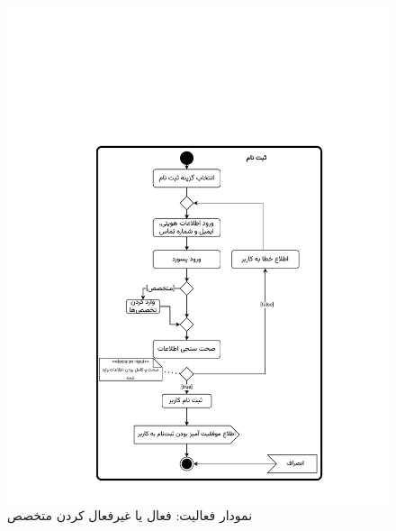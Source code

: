\begin{figure}[ht!]
	\centering
	\includegraphics[scale=0.8, page=8]{figs/OOD-activity1-10.pdf}
	\caption{نمودار فعالیت: فعال یا غیرفعال کردن متخصص}
\end{figure}
\FloatBarrier
\newpage

